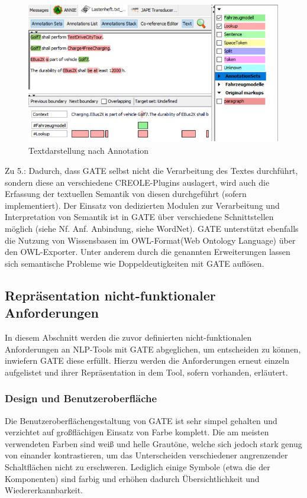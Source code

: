 \documentclass[12pt]{report}
\begin{document}
\begin{figure}
\begin{center}
\includegraphics[scale=0.8]{GATE_Bilder/GATE-MarkUp.png}
\caption{Textdarstellung nach Annotation}
\end{center}
\end{figure}


Zu 5.: Dadurch, dass GATE selbst nicht die Verarbeitung des Textes durchführt, sondern diese an verschiedene CREOLE-Plugins auslagert, wird auch die Erfassung der textuellen Semantik von diesen durchgeführt (sofern implementiert). Der Einsatz von dedizierten Modulen zur Verarbeitung und Interpretation von Semantik ist in GATE über verschiedene Schnittstellen möglich (siehe Nf. Anf. Anbindung, siehe WordNet). GATE unterstützt ebenfalls die Nutzung von Wissensbasen im OWL-Format(Web Ontology Language) über den OWL-Exporter. Unter anderem durch die genannten Erweiterungen lassen sich semantische Probleme wie Doppeldeutigkeiten mit GATE auflösen.

\subsection{Repräsentation nicht-funktionaler Anforderungen}
In diesem Abschnitt werden die zuvor definierten nicht-funktionalen Anforderungen an NLP-Tools mit GATE abgeglichen, um entscheiden zu können, inwiefern GATE diese erfüllt. Hierzu werden die Anforderungen erneut einzeln aufgelistet und ihrer Repräsentation in dem Tool, sofern vorhanden, erläutert. 

\subsubsection{Design und Benutzeroberfläche}

Die Benutzeroberflächengestaltung von GATE ist sehr simpel gehalten und verzichtet auf großflächigen Einsatz von Farbe komplett. Die am meisten verwendeten Farben sind weiß und helle Grautöne, welche sich jedoch stark genug von einander kontrastieren, um das Unterscheiden verschiedener angrenzender Schaltflächen nicht zu erschweren. Lediglich einige Symbole (etwa die der Komponenten) sind farbig und erhöhen dadurch Übersichtlichkeit und Wiedererkannbarkeit. 
\end{document}
